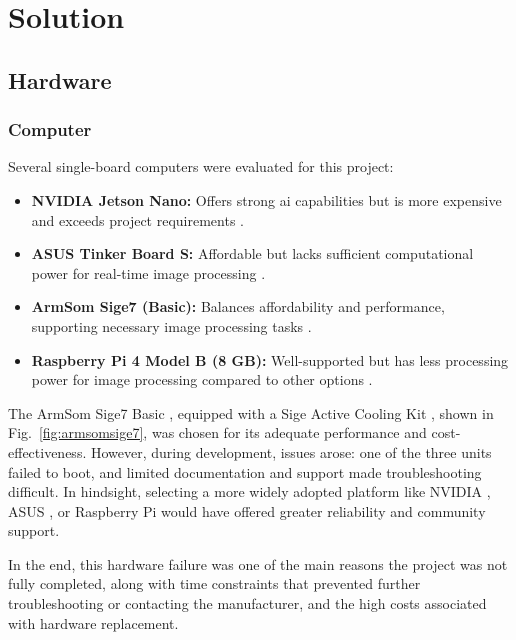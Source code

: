 \chapter{Solution}

\section{Hardware}

\subsection{Computer}\label{subsec:solution_computer}

Several single-board computers were evaluated for this project:

\begin{itemize}
	\item \textbf{NVIDIA Jetson Nano:} Offers strong \acrshort{ai} capabilities but is more expensive and exceeds project requirements \cite{nvidia_jetson_nano}.
	\item \textbf{ASUS Tinker Board S:} Affordable but lacks sufficient computational power for real-time image processing \cite{asus_tinkerboard_s}.
	\item \textbf{ArmSom Sige7 (Basic):} Balances affordability and performance, supporting necessary image processing tasks \cite{armsom_sige7}.
	\item \textbf{Raspberry Pi 4 Model B (8 GB):} Well-supported but has less processing power for image processing compared to other options \cite{raspberry_pi_4b}.
\end{itemize}

The ArmSom Sige7 Basic \cite{armsom_sige7}, equipped with a Sige Active Cooling Kit \cite{armsom_sige_cooling_kit}, shown in Fig.~\ref{fig:armsomsige7}, was chosen for its adequate performance and cost-effectiveness. However, during development, issues arose: one of the three units failed to boot, and limited documentation and support made troubleshooting difficult. In hindsight, selecting a more widely adopted platform like NVIDIA \cite{nvidia_jetson_nano}, ASUS \cite{asus_tinkerboard_s}, or Raspberry Pi \cite{raspberry_pi_4b} would have offered greater reliability and community support.

In the end, this hardware failure was one of the main reasons the project was not fully completed, along with time constraints that prevented further troubleshooting or contacting the manufacturer, and the high costs associated with hardware replacement.

